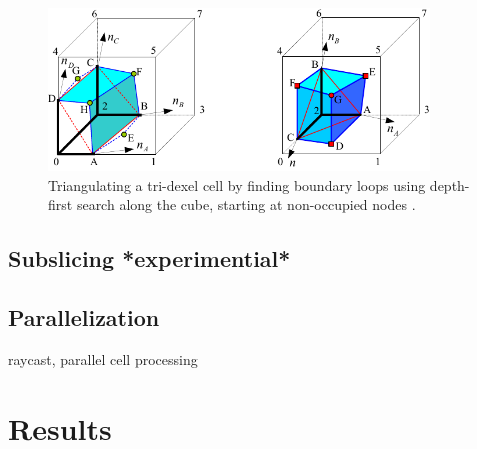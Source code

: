 \begin{figure}
	\centering
	\includegraphics[width=0.9\textwidth]{images/tri_dexel_refinement}
	\caption{
		Triangulating a tri-dexel cell by finding boundary loops using depth-first search along the cube, starting at non-occupied nodes \cite{tri_dexel_refinement}.
	}
	\label{fig:tri_dexel_refinement}
\end{figure}


\subsection{Subslicing *experimential*}
\label{sec:tri_dexel_subslicing}



\subsection{Parallelization}
\label{sec:tri_dexel_parallelization}

raycast, parallel cell processing


\section{Results}
\label{sec:tri_dexel_results}


